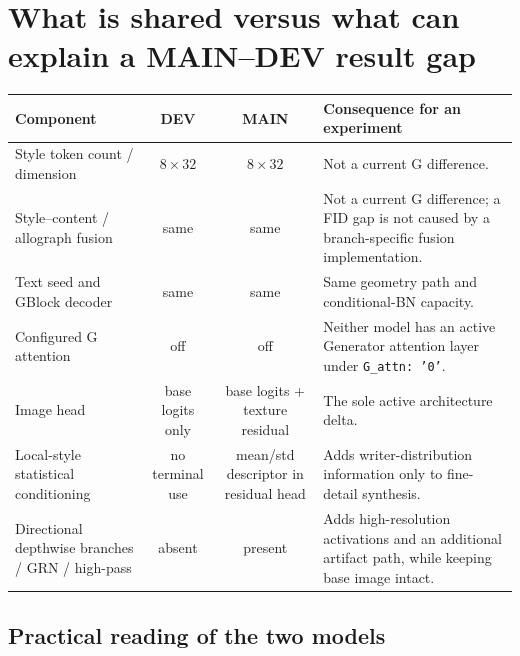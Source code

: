 \documentclass[10pt,a4paper]{article}
\newcommand{\dev}{\textcolor{blue!65!black}{\textbf{DEV}}}
\newcommand{\mainbranch}{\textcolor{orange!55!black}{\textbf{MAIN}}}
\begin{document}
\section{What is shared versus what can explain a MAIN--DEV result gap}

\begin{center}
\small
\begin{tabularx}{\textwidth}{@{}p{}c c X@{}}
\toprule
Component & \dev{} & \mainbranch{} & Consequence for an experiment \\
\midrule
Style token count / dimension & $8\times32$ & $8\times32$ & Not a current G difference. \\
Style--content / allograph fusion & same & same & Not a current G difference; a FID gap is not caused by a branch-specific fusion implementation. \\
Text seed and GBlock decoder & same & same & Same geometry path and conditional-BN capacity. \\
Configured G attention & off & off & Neither model has an active Generator attention layer under \texttt{G\_attn: '0'}. \\
Image head & base logits only & base logits + texture residual & The sole active architecture delta. \\
Local-style statistical conditioning & no terminal use & mean/std descriptor in residual head & Adds writer-distribution information only to fine-detail synthesis. \\
Directional depthwise branches / GRN / high-pass & absent & present & Adds high-resolution activations and an additional artifact path, while keeping base image intact. \\
\bottomrule
\end{tabularx}
\end{center}

\subsection*{Practical reading of the two models}
\end{document}
